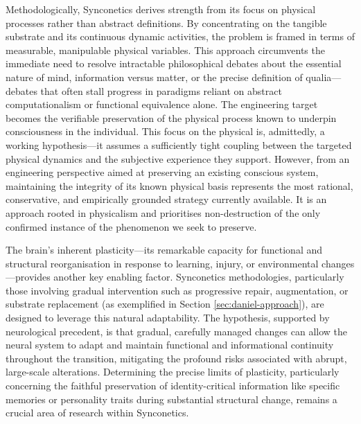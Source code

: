\documentclass[10pt]{article}
\begin{document}
\begin{sloppypar}
  Methodologically, Synconetics derives strength from its focus on physical processes rather than abstract definitions. By concentrating on the tangible substrate and its continuous dynamic activities, the problem is framed in terms of measurable, manipulable physical variables. This approach circumvents the immediate need to resolve intractable philosophical debates about the essential nature of mind, information versus matter, or the precise definition of qualia—debates that often stall progress in paradigms reliant on abstract computationalism or functional equivalence alone. The engineering target becomes the verifiable preservation of the physical process known to underpin consciousness in the individual. This focus on the physical is, admittedly, a working hypothesis—it assumes a sufficiently tight coupling between the targeted physical dynamics and the subjective experience they support. However, from an engineering perspective aimed at preserving an existing conscious system, maintaining the integrity of its known physical basis represents the most rational, conservative, and empirically grounded strategy currently available. It is an approach rooted in physicalism and prioritises non-destruction of the only confirmed instance of the phenomenon we seek to preserve.

  The brain’s inherent plasticity—its remarkable capacity for functional and structural reorganisation in response to learning, injury, or environmental changes—provides another key enabling factor. Synconetics methodologies, particularly those involving gradual intervention such as progressive repair, augmentation, or substrate replacement (as exemplified in Section \ref{sec:daniel-approach}), are designed to leverage this natural adaptability. The hypothesis, supported by neurological precedent, is that gradual, carefully managed changes can allow the neural system to adapt and maintain functional and informational continuity throughout the transition, mitigating the profound risks associated with abrupt, large-scale alterations. Determining the precise limits of plasticity, particularly concerning the faithful preservation of identity-critical information like specific memories or personality traits during substantial structural change, remains a crucial area of research within Synconetics.


\end{sloppypar}
\end{document}
